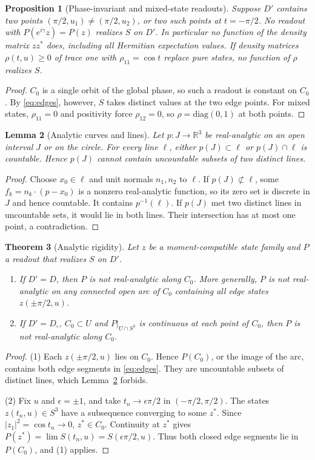 \documentclass[11pt]{article}
\newtheorem{theorem}{Theorem}[section]
\newtheorem{proposition}[theorem]{Proposition}
\newtheorem{lemma}[theorem]{Lemma}
\theoremstyle{definition}\newtheorem{definition}[theorem]{Definition}
\theoremstyle{remark}\newtheorem{remark}[theorem]{Remark}
\newcommand{\R}{\mathbb R}\newcommand{\C}{\mathbb C}\newcommand{\Z}{\mathbb Z}
\begin{document}
\begin{proposition}[Phase-invariant and mixed-state readouts]\label{prop:gauge}
Suppose $D'$ contains two points $(\pi/2,u_1)\neq(\pi/2,u_2)$, or two such
points at $t=-\pi/2$. No readout with $P(e^{i\gamma}z)=P(z)$ realizes $S$ on $D'$.
In particular no function of the density matrix $zz^*$ does, including all
Hermitian expectation values. If density matrices $\rho(t,u)\geq0$ of trace one
with $\rho_{11}=\cos t$ replace pure states, no function of $\rho$ realizes $S$.
\end{proposition}
\begin{proof}
$C_0$ is a single orbit of the global phase, so such a readout is constant on
$C_0$. By \eqref{eq:edges}, however, $S$ takes distinct values at the two edge
points. For mixed states, $\rho_{11}=0$ and positivity force $\rho_{12}=0$, so
$\rho=\mathrm{diag}(0,1)$ at both points.
\end{proof}

\begin{lemma}[Analytic curves and lines]\label{lem:analytic}
Let $p:J\to\R^3$ be real-analytic on an open interval $J$ or on the circle. For
every line $\ell$, either $p(J)\subset\ell$ or $p(J)\cap\ell$ is countable.
Hence $p(J)$ cannot contain uncountable subsets of two distinct lines.
\end{lemma}
\begin{proof}
Choose $x_0\in\ell$ and unit normals $n_1,n_2$ to $\ell$. If $p(J)\not\subset\ell$,
some $f_k=n_k\cdot(p-x_0)$ is a nonzero real-analytic function, so its zero set is
discrete in $J$ and hence countable. It contains $p^{-1}(\ell)$. If $p(J)$
met two distinct lines in uncountable sets, it would lie in both lines. Their
intersection has at most one point, a contradiction.
\end{proof}

\begin{theorem}[Analytic rigidity]\label{thm:rigidity}
Let $z$ be a moment-compatible state family and $P$ a readout that realizes $S$
on $D'$.
\begin{enumerate}
\item If $D'=D$, then $P$ is not real-analytic along $C_0$. More generally,
$P$ is not real-analytic on any connected open arc of $C_0$ containing all
edge states $z(\pm\pi/2,u)$.
\item If $D'=D_\circ$, $C_0\subset U$ and $P|_{U\cap S^3}$ is continuous at each
point of $C_0$, then $P$ is not real-analytic along $C_0$.
\end{enumerate}
\end{theorem}
\begin{proof}
(1) Each $z(\pm\pi/2,u)$ lies on $C_0$. Hence $P(C_0)$, or the image of the arc,
contains both edge segments in \eqref{eq:edges}. They are uncountable subsets
of distinct lines, which Lemma~\ref{lem:analytic} forbids.

(2) Fix $u$ and $\epsilon=\pm1$, and take $t_n\to\epsilon\pi/2$ in
$(-\pi/2,\pi/2)$. The states $z(t_n,u)\in S^3$ have a subsequence converging to
some $z^*$. Since $|z_1|^2=\cos t_n\to0$, $z^*\in C_0$. Continuity at $z^*$
gives $P(z^*)=\lim S(t_n,u)=S(\epsilon\pi/2,u)$. Thus both closed edge segments
lie in $P(C_0)$, and (1) applies.
\end{proof}
\end{document}
